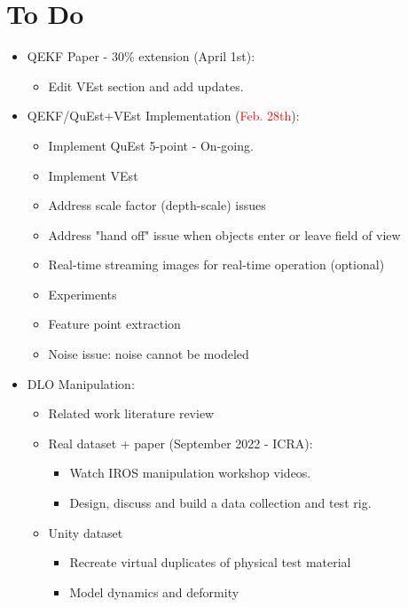 \documentclass[11pt]{article}
\begin{document}
\section{To Do}
\begin{itemize}
  \item QEKF Paper - 30\% extension (April 1st):
  \begin{itemize}
      \item Edit VEst section and add updates.
  \end{itemize}
  \item QEKF/QuEst+VEst Implementation (\textcolor{red}{Feb. 28th}):
  \begin{itemize}
      \item Implement QuEst 5-point - On-going.
      \item Implement VEst
      \item Address scale factor (depth-scale) issues
      \item Address "hand off" issue when objects enter or leave field of view
      \item Real-time streaming images for real-time operation (optional)
      \item Experiments
      \item Feature point extraction
      \item Noise issue: noise cannot be modeled
  \end{itemize}
  \item  DLO Manipulation:
  \begin{itemize}
      \item Related work literature review
      \item Real dataset + paper (September 2022 - ICRA):
      \begin{itemize}
            \item Watch IROS manipulation workshop videos.
            \item Design, discuss and build a data collection and test rig.
      \end{itemize}
      \item Unity dataset
      \begin{itemize}
            \item Recreate virtual duplicates of physical test material
            \item Model dynamics and deformity
      \end{itemize}
  \end{itemize}
\end{itemize}
\end{document}
